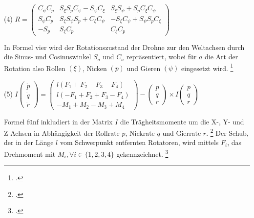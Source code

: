 \begin{description}
    \item \begin{center} (4) $R = \begin{pmatrix} C_{\psi}C_{p} & S_{\xi}S_{p}C_{\psi} - S_{\psi}C_{\xi} & S_{\xi}S_{\psi}+S_{p}C_{\xi}C_{\psi} \\ S_{\psi}C_{p} & S_{\xi}S_{\psi}S_{p} + C_{\xi}C_{\psi} &  -S_{\xi}C_{\psi} + S_{\psi}S_{p}C_{\xi}\\ -S_{p} & S_{\xi}C_{p} & C_{\xi}C_{p} \end{pmatrix}$ \end{center}
\end{description}
In Formel vier wird der Rotationszustand der Drohne zur den Weltachsen durch die Sinus- und Cosinuswinkel $S_{a}$ und $C_{a}$ repräsentiert, wobei für $a$ die Art der Rotation also Rollen $(\xi)$, Nicken $(p)$ und Gieren $(\psi)$ eingesetzt wird. \footcite[Vgl.][S. 2]{Deshpande.2021}
\begin{description}
    \item \begin{center} (5) $I\begin{pmatrix} \dot p \\ \dot q \\ \dot r\end{pmatrix} = \begin{pmatrix} l(F_{1} + F_{2} - F_{3} - F_{4}) \\ l(-F_{1} + F_{2} + F_{3} - F_{4}) \\ -M_{1} + M_{2} - M_{3} + M_{4}\end{pmatrix} - \begin{pmatrix} p \\ q \\ r \end{pmatrix} \times I\begin{pmatrix} p \\ q \\ r \end{pmatrix}$ \end{center}
\end{description}
Formel fünf inkludiert in der Matrix $I$ die Trägheitsmomente um die X-, Y- und Z-Achsen in Abhängigkeit der Rollrate $p$, Nickrate $q$ und Gierrate $r$. \footcite[Vgl.][S. 2]{Deshpande.2021}
Der Schub, der in der Länge $l$ vom Schwerpunkt entfernten Rotatoren, wird mittels $F_{i}$, das Drehmoment mit $M_{i}, \forall i \in \{1,2,3,4\}$ gekennzeichnet. \footcite[Vgl.][S. 3]{Deshpande.2020}

